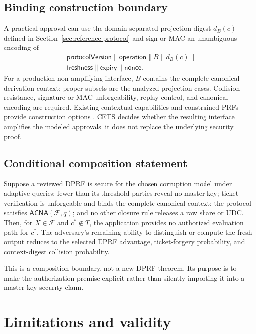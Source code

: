 \documentclass[preprint,12pt]{elsarticle}
\begin{document}
\subsection{Binding construction boundary}

A practical approval can use the domain-separated projection digest $d_B(c)$
defined in Section~\ref{sec:reference-protocol} and sign or MAC an unambiguous
encoding of
\[
\begin{aligned}
&\mathsf{protocolVersion}\parallel\mathsf{operation}\parallel
  B\parallel d_B(c)\parallel{}\\
&\mathsf{freshness}\parallel\mathsf{expiry}\parallel\mathsf{nonce}.
\end{aligned}
\]
For a production non-amplifying interface, $B$ contains the complete canonical
derivation context; proper subsets are the analyzed projection cases.
Collision resistance, signature or MAC unforgeability, replay control, and
canonical encoding are required.  Existing contextual capabilities and
constrained PRFs provide construction options
\cite{birgisson2014macaroons,boneh2013constrained}.  CETS decides whether the
resulting interface amplifies the modeled approvals; it does not replace the
underlying security proof.

\subsection{Conditional composition statement}

Suppose a reviewed DPRF is secure for the chosen corruption model under
adaptive queries; fewer than its threshold parties reveal no master key; ticket
verification is unforgeable and binds the complete canonical context; the
protocol satisfies $\mathsf{ACNA}(\mathcal{F},q)$; and no other closure rule
releases a raw share or UDC.  Then, for $X\in\mathcal{F}$ and
$c^*\notin T$, the application provides no authorized evaluation path for
$c^*$.  The adversary's remaining ability to distinguish or compute the fresh
output reduces to the selected DPRF advantage, ticket-forgery probability, and
context-digest collision probability.

This is a composition boundary, not a new DPRF theorem.  Its purpose is to make
the authorization premise explicit rather than silently importing it into a
master-key security claim.

\section{Limitations and validity}
\end{document}
